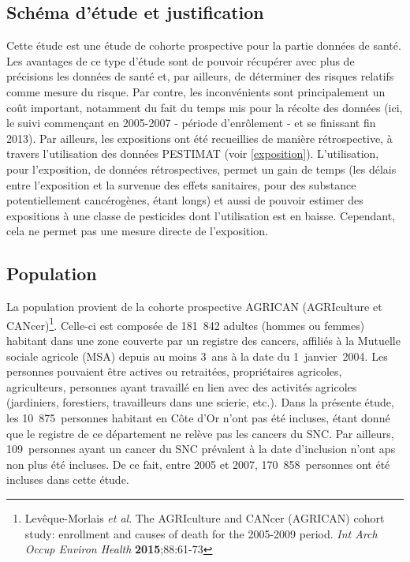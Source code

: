 \documentclass[10pt]{article}
\begin{document}
\subsection{Schéma d'étude et justification}
Cette étude est une étude de cohorte prospective pour la partie données de santé. Les avantages de ce type d'étude sont de pouvoir récupérer avec plus de précisions les données de santé et, par ailleurs, de déterminer des risques relatifs comme mesure du risque. Par contre, les inconvénients sont principalement un coût important, notamment du fait du temps mis pour la récolte des données (ici, le suivi commençant en 2005-2007 - période d'enrôlement - et se finissant fin 2013). 
Par ailleurs, les expositions ont été recueillies de manière rétrospective, à travers l'utilisation des données PESTIMAT (voir \ref{exposition}). L'utilisation, pour l'exposition, de données rétrospectives, permet un gain de temps (les délais entre l'exposition et la survenue des effets sanitaires, pour des substance potentiellement cancérogènes, étant longs) et aussi de pouvoir estimer des expositions à une classe de pesticides dont l'utilisation est en baisse. Cependant, cela ne permet pas une mesure directe de l'exposition. 

\subsection{Population}
La population provient de la cohorte prospective AGRICAN (AGRIculture et CANcer)\footnote{Levêque-Morlais \emph{et al}. The AGRIculture and CANcer (AGRICAN) cohort study: enrollment and causes of death for the 2005-2009 period. \emph{Int Arch Occup Environ Health} \textbf{2015};88:61-73}. Celle-ci est composée de 181~842 adultes (hommes ou femmes) habitant dans une zone couverte par un registre des cancers, affiliés à la Mutuelle sociale agricole (MSA) depuis au moins 3~ans à la date du 1~janvier~2004. Les personnes pouvaient être actives ou retraitées, propriétaires agricoles, agriculteurs, personnes ayant travaillé en lien avec des activités agricoles (jardiniers, forestiers, travailleurs dans une scierie, etc.). Dans la présente étude, les 10~875~personnes habitant en Côte d'Or n'ont pas été incluses, étant donné que le registre de ce département ne relève pas les cancers du SNC. Par ailleurs, 109~personnes ayant un cancer du SNC prévalent à la date d'inclusion n'ont aps non plus été incluses. De ce fait, entre 2005 et 2007, 170~858~personnes ont été incluses dans cette étude.
\end{document}
